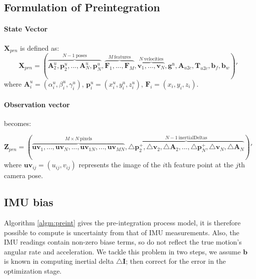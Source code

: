 \documentclass[12pt]{article}   %
\begin{document}
\subsection{Formulation of Preintegration}
\paragraph{State Vector} $\textbf{X}_{prn}$ is defined as:
$$\textbf{X}_{prn} = (\overbrace{\textbf{A}^u_2, \textbf{p}^u_{2}, ... , \textbf{A}^u_{N}, \textbf{p}^u_{N}}^{N - 1 \ {\mathrm{ poses}}}, \overbrace{\textbf{F}_{1}, ..., \textbf{F}_{M}}^{M  \ {\mathrm{features}}}, \overbrace{\textbf{v}_1, ..., \textbf{v}_{N}}^{N \ {\mathrm{velocities}}},  \textbf{g}^{\mathrm{n}}, \textbf{A}_{u2c}, \textbf{T}_{u2c}, \textbf{b}_f, \textbf{b}_w)' $$
where
$\textbf{A}^u_i = (\alpha^u_i, \beta^u_i, \gamma^u_i)$,
$\textbf{p}^u_i = (x^u_i, y^u_i, z^u_i) $,
$\textbf{F}_{i} = (x_{i}, y_{i}, z_{i}) $.
\paragraph{Observation vector} becomes:

$$\textbf{Z}_{prn} = (\overbrace{\textbf{uv}_{1}, ... , \textbf{uv}_{N}, ..., \textbf{uv}_{1N}, ... , \textbf{uv}_{MN}}^{M \times N  \ {\mathrm{pixels}}}, \overbrace{\triangle \textbf{p}^+_2, \triangle  \textbf{v}_2, \triangle \textbf{A}_2, ..., \triangle  \textbf{p}^+_N, \triangle \textbf{v}_N, \triangle  \textbf{A}_N}^{N - 1 \ {\mathrm{inertialDeltas}}})' $$
where $\textbf{uv}_{ij} = (u_{ij}, v_{ij})$ represents the image of the $i$th feature point  at the $j$th camera pose.


\subsection{IMU bias}
Algorithm \ref{algm:preint} gives the pre-integration process model, it is therefore possible to compute is uncertainty from that of IMU measurements. Also, the IMU readings contain non-zero biase terms, so do not reflect the true motion's angular rate and acceleration. We tackle this problem in two steps, we assume $\bm{b}$ is known in computing inertial delta $\triangle \bm{I}$; then correct for the error in the optimization stage.
\end{document}
